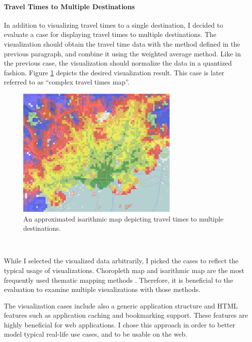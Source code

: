 \paragraph{Travel Times to Multiple Destinations}
In addition to visualizing travel times to a single destination, I decided to evaluate a case for displaying travel times to multiple destinations. The visualization should obtain the travel time data with the method defined in the previous paragraph, and combine it using the weighted average method. Like in the previous case, the visualization should normalize the data in a quantized fashion. Figure \ref{fig:isarithmicimplcomplex} depicts the desired visualization result. This case is later referred to as ``complex travel times map''.

\begin{figure}[htbp]
  \begin{center}
    \includegraphics[width=8cm]{images/isarithmic-example-thematic-complex.png}
    \caption{An approximated isarithmic map depicting travel times to multiple destinations.}
    \label{fig:isarithmicimplcomplex}
  \end{center}
\end{figure}

~

While I selected the visualized data arbitrarily, I picked the cases to reflect the typical usage of visualizations. Choropleth map and isarithmic map are the most frequently used thematic mapping methods \citep[chap.~14-15]{slocum_thematic_2014}. Therefore, it is beneficial to the evaluation to examine multiple visualizations with those methods.

 The visualization cases include also a generic application structure and HTML features such as application caching and bookmarking support. These features are highly beneficial for web applications. I chose this approach in order to better model typical real-life use cases, and to be usable on the web.

